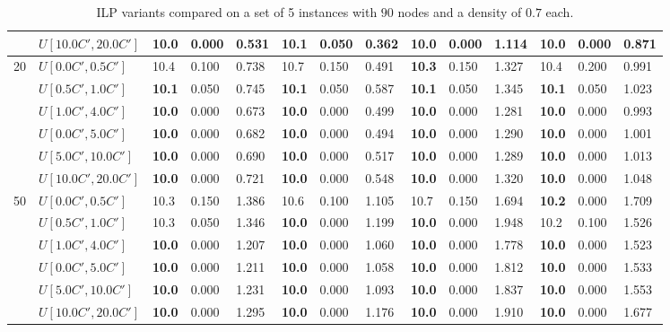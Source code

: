 \begin{table}[h]
{\begin{tabular}{|l|l||l|l|l||l|l|l||l|l|l||l|l|l|}
       & $U[10.0C',20.0C']$ & \textbf{10.0} & 0.000 & 0.531 & 10.1 & 0.050 & 0.362 & \textbf{10.0} & 0.000 & 1.114 & \textbf{10.0} & 0.000 & 0.871 \\
      \hline\hline
      \multirow{6}{*}{20} & $U[0.0C',0.5C']$ & 10.4 & 0.100 & 0.738 & 10.7 & 0.150 & 0.491 & \textbf{10.3} & 0.150 & 1.327 & 10.4 & 0.200 & 0.991 \\
       & $U[0.5C',1.0C']$ & \textbf{10.1} & 0.050 & 0.745 & \textbf{10.1} & 0.050 & 0.587 & \textbf{10.1} & 0.050 & 1.345 & \textbf{10.1} & 0.050 & 1.023 \\
       & $U[1.0C',4.0C']$ & \textbf{10.0} & 0.000 & 0.673 & \textbf{10.0} & 0.000 & 0.499 & \textbf{10.0} & 0.000 & 1.281 & \textbf{10.0} & 0.000 & 0.993 \\
       & $U[0.0C',5.0C']$ & \textbf{10.0} & 0.000 & 0.682 & \textbf{10.0} & 0.000 & 0.494 & \textbf{10.0} & 0.000 & 1.290 & \textbf{10.0} & 0.000 & 1.001 \\
       & $U[5.0C',10.0C']$ & \textbf{10.0} & 0.000 & 0.690 & \textbf{10.0} & 0.000 & 0.517 & \textbf{10.0} & 0.000 & 1.289 & \textbf{10.0} & 0.000 & 1.013 \\
       & $U[10.0C',20.0C']$ & \textbf{10.0} & 0.000 & 0.721 & \textbf{10.0} & 0.000 & 0.548 & \textbf{10.0} & 0.000 & 1.320 & \textbf{10.0} & 0.000 & 1.048 \\
      \hline\hline
      \multirow{6}{*}{50} & $U[0.0C',0.5C']$ & 10.3 & 0.150 & 1.386 & 10.6 & 0.100 & 1.105 & 10.7 & 0.150 & 1.694 & \textbf{10.2} & 0.000 & 1.709 \\
       & $U[0.5C',1.0C']$ & 10.3 & 0.050 & 1.346 & \textbf{10.0} & 0.000 & 1.199 & \textbf{10.0} & 0.000 & 1.948 & 10.2 & 0.100 & 1.526 \\
       & $U[1.0C',4.0C']$ & \textbf{10.0} & 0.000 & 1.207 & \textbf{10.0} & 0.000 & 1.060 & \textbf{10.0} & 0.000 & 1.778 & \textbf{10.0} & 0.000 & 1.523 \\
       & $U[0.0C',5.0C']$ & \textbf{10.0} & 0.000 & 1.211 & \textbf{10.0} & 0.000 & 1.058 & \textbf{10.0} & 0.000 & 1.812 & \textbf{10.0} & 0.000 & 1.533 \\
       & $U[5.0C',10.0C']$ & \textbf{10.0} & 0.000 & 1.231 & \textbf{10.0} & 0.000 & 1.093 & \textbf{10.0} & 0.000 & 1.837 & \textbf{10.0} & 0.000 & 1.553 \\
       & $U[10.0C',20.0C']$ & \textbf{10.0} & 0.000 & 1.295 & \textbf{10.0} & 0.000 & 1.176 & \textbf{10.0} & 0.000 & 1.910 & \textbf{10.0} & 0.000 & 1.677 \\
      \hline
      \end{tabular}
      }
      \caption{ILP variants compared on a set of 5 instances with $90$ nodes and a density of $0.7$ each.}
      \label{tab:pcpn90p7ILPVariant}\end{table}
      
